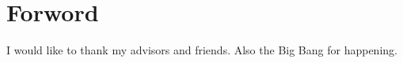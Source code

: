 \section*{Forword}

I would like to thank my advisors and friends. Also the Big Bang for happening.

